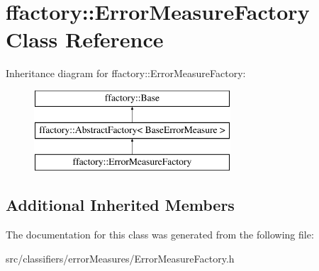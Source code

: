 \hypertarget{classffactory_1_1_error_measure_factory}{\section{ffactory\-:\-:Error\-Measure\-Factory Class Reference}
\label{classffactory_1_1_error_measure_factory}
}
Inheritance diagram for ffactory\-:\-:Error\-Measure\-Factory\-:\begin{figure}[H]
\begin{center}
\leavevmode
\includegraphics[height=3.000000cm]{classffactory_1_1_error_measure_factory}
\end{center}
\end{figure}
\subsection*{Additional Inherited Members}


The documentation for this class was generated from the following file\-:\begin{DoxyCompactItemize}
\item 
src/classifiers/error\-Measures/Error\-Measure\-Factory.\-h\end{DoxyCompactItemize}

